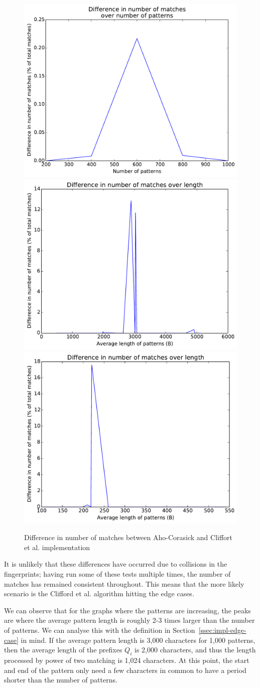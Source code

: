 \documentclass[ %
                    author={Dominic Joseph Moylett},
                    degree={MEng},
                     title={Dictionary Matching with Fingerprints},
                  subtitle={An Empirical Analysis},
                      type={research},
                      year={2015} ]{dissertation}
\begin{document}
\begin{figure}[t]
\begin{center}
  \includegraphics[width=0.5\linewidth]{diff_num_200_1000}\\
  \includegraphics[width=0.5\linewidth]{diff_length_1000_10000}\includegraphics[width=0.5\linewidth]{diff_length_200_1000}
\end{center}
\caption{Difference in number of matches between Aho-Corasick and Cliffort et al. implementation}
\label{fig:diff-results}
\end{figure}

It is unlikely that these differences have occurred due to collisions in the fingerprints; having run some of these tests multiple times, the number of matches has remained consistent throughout. This means that the more likely scenario is the Clifford et al. algorithm hitting the edge cases.

We can observe that for the graphs where the patterns are increasing, the peaks are where the average pattern length is roughly 2-3 times larger than the number of patterns. We can analyse this with the definition in Section~\ref{ssec:impl-edge-case} in mind. If the average pattern length is 3,000 characters for 1,000 patterns, then the average length of the prefixes $Q_i$ is 2,000 characters, and thus the length processed by power of two matching is 1,024 characters. At this point, the start and end of the pattern only need a few characters in common to have a period shorter than the number of patterns.
\end{document}

